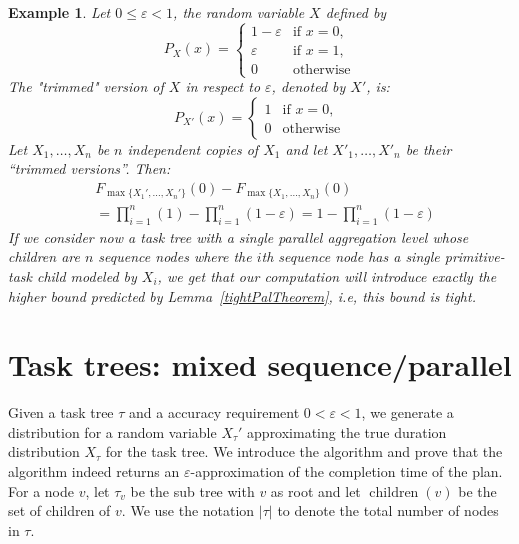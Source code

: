 \documentclass[review]{elsarticle}
\newtheorem{example}{Example}
\DeclareMathOperator{\ch}{\operatorname{children}}
\begin{document}
\begin{example}\label{expl:parallel}
Let $0 {\leq} \varepsilon {<}1$, 
the random variable $X$ defined by
$$
P_{X}(x) =\begin{cases}
1-\varepsilon  & \text{if } x=0, \\
\varepsilon     & \text{if } x=1, \\
0 & \text{otherwise}
\end{cases}
$$
The "trimmed" version of $X$ in respect to $\varepsilon$, denoted by $X'$, is:
$$
P_{X'}(x) =\begin{cases}
1  & \text{if } x=0, \\
0 & \text{otherwise}
\end{cases}
$$
Let $X_1, \dots, X_n$ be $n$ independent copies of $X_1$ and let $X'_1, \dots, X'_n$ be their ``trimmed versions''. Then:
{
\begin{align*} 
&F_{\max\{X_1',\dots, X_n'\}}( 0) - F_{\max\{X_1,\dots, X_n\}} (0)\\
&=\prod_{i=1}^n (1)-\prod_{i=1}^n (1-\varepsilon)= 1-\prod_{i=1}^n (1-\varepsilon)
\end{align*}}
If we consider now a task tree with a single parallel aggregation level whose children are $n$ 
sequence nodes where the $i$th sequence node has a single primitive-task child modeled by $X_i$, we get that our
computation will introduce exactly the higher bound predicted by Lemma~\ref{tightPalTheorem}, i.e, this bound is tight.
\end{example}

\section{Task trees: mixed sequence/parallel}

Given a task tree $\tau$ and a accuracy requirement $0<\varepsilon<1$, we generate a distribution for a random variable $X_{\tau}'$ approximating the true duration distribution  $X_{\tau}$ for the task tree. 
We introduce the algorithm and prove that the algorithm indeed returns an $\varepsilon$-approximation of the completion time of the plan. 
For a node $v$, let $\tau_v $ be the sub tree with $v$ as root and let $\ch(v)$ be the set of children of $v$.
We use the notation $|\tau|$ to denote the total number of nodes in $\tau$.
\end{document}
